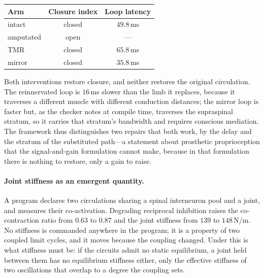 \documentclass[11pt,twocolumn,a4paper]{article}
\theoremstyle{thmstyle}
\theoremstyle{definition}
\theoremstyle{remark}
\begin{document}
\begin{center}
\begin{tabular}{@{}lcc@{}}
\toprule
Arm & Closure index & Loop latency\\
\midrule
intact    & closed & $49.8$\,ms\\
amputated & open   & ---\\
TMR       & closed & $65.8$\,ms\\
mirror    & closed & $35.8$\,ms\\
\bottomrule
\end{tabular}
\end{center}

Both interventions restore closure, and neither restores the original
circulation. The reinnervated loop is $16$\,ms slower than the limb it
replaces, because it traverses a different muscle with different conduction
distances; the mirror loop is faster but, as the checker notes at compile
time, traverses the supraspinal stratum, so it carries that stratum's
bandwidth and requires conscious mediation. The framework thus distinguishes
two repairs that both work, by the delay and the stratum of the substituted
path---a statement about prosthetic proprioception that the signal-and-gain
formulation cannot make, because in that formulation there is nothing to
restore, only a gain to raise.

\paragraph{Joint stiffness as an emergent quantity.}
A program declares two circulations sharing a spinal interneuron pool and a
joint, and measures their co-activation. Degrading reciprocal inhibition
raises the co-contraction ratio from $0.63$ to $0.87$ and the joint
stiffness from $139$ to $148$\,N/m. No stiffness is commanded anywhere in
the program; it is a property of two coupled limit cycles, and it moves
because the coupling changed. Under  this is what
stiffness must be: if the circuits admit no static equilibrium, a joint held
between them has no equilibrium stiffness either, only the effective
stiffness of two oscillations that overlap to a degree the coupling sets.
\end{document}
